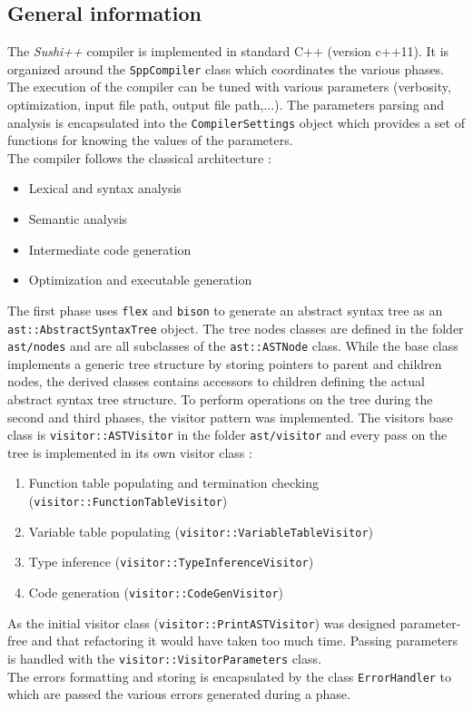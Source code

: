 \documentclass[a4paper,11pt]{article}
\begin{document}
\subsection{General information}
The \textit{Sushi++} compiler is implemented in standard C++ (version c++11). It is organized around the \texttt{SppCompiler} class which coordinates the various phases. The execution of the compiler can be tuned with various parameters (verbosity, optimization, input file path, output file path,...). The parameters parsing and analysis is encapsulated into the \texttt{CompilerSettings} object which provides a set of functions for knowing the values of the parameters. \\
The compiler follows the classical architecture :
\begin{itemize}
	\item Lexical and syntax analysis
	\item Semantic analysis
	\item Intermediate code generation
	\item Optimization and executable generation
\end{itemize}
The first phase uses \texttt{flex} and \texttt{bison} to generate an abstract syntax tree as an \texttt{ast::AbstractSyntaxTree} object. The tree nodes  classes are defined in the folder \texttt{ast/nodes} and are all subclasses of the \texttt{ast::ASTNode} class. While the base class implements a generic tree structure by storing pointers to parent and children nodes, the derived classes contains accessors to children defining the actual abstract syntax tree structure. To perform operations on the tree during the second and third phases, the visitor pattern was implemented. The visitors base class is \texttt{visitor::ASTVisitor} in the folder \texttt{ast/visitor} and every pass on the tree is implemented in its own visitor class :
\begin{enumerate}
	\item Function table populating and termination checking (\texttt{visitor::FunctionTableVisitor})
	\item Variable table populating (\texttt{visitor::VariableTableVisitor})
	\item Type inference (\texttt{visitor::TypeInferenceVisitor})
	\item Code generation (\texttt{visitor::CodeGenVisitor})
\end{enumerate}
As the initial visitor class (\texttt{visitor::PrintASTVisitor}) was designed parameter-free and that refactoring it would have taken too much time. Passing parameters is handled with the \texttt{visitor::VisitorParameters} class.  \\
The errors formatting and storing is encapsulated by the class \texttt{ErrorHandler} to which are passed the various errors generated during a phase.
\end{document}
